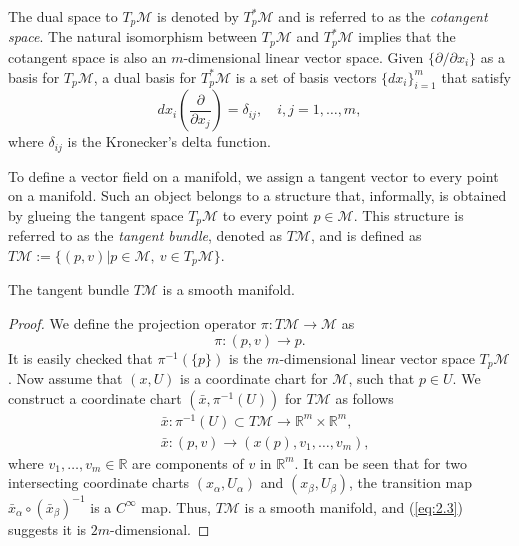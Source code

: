 The dual space to $T_p\mathcal M$ is denoted by $T_p^*\mathcal M$ and is referred to as the \emph{cotangent space}. The natural isomorphism between $T_p\mathcal M$ and $T_p^*\mathcal M$ implies that the cotangent space is also an $m$-dimensional linear vector space. Given $\{ \partial /\partial x_i \}$ as a basis for $T_p\mathcal M$, a dual basis for $T_p^*\mathcal M$ is a set of basis vectors $\{ dx_i \}_{i=1}^{m}$ that satisfy
\begin{equation} \label{eq:2.13}
	dx_i(\frac{\partial}{\partial x_j}) = \delta_{ij}, \quad i,j=1,\dots,m,
\end{equation}
where $\delta_{ij}$ is the Kronecker's delta function.

To define a vector field on a manifold, we assign a tangent vector to every point on a manifold. Such an object belongs to a structure that, informally, is obtained by glueing the tangent space $T_p\mathcal M$ to every point $p\in \mathcal M$. This structure is referred to as the \emph{tangent bundle}, denoted as $T \mathcal M$, and is defined as $T \mathcal M := \{ (p,v) | p\in \mathcal M, \ v \in T_p \mathcal M\}$.
\begin{theorem} \label{theorem:2.1}
\cite{robbin2011introduction} The tangent bundle $T\mathcal M$ is a smooth manifold.
\end{theorem}

\begin{proof}
We define the projection operator $\pi:T\mathcal M \to \mathcal M$ as
\begin{equation} \label{eq:2.2}
	\pi : (p,v) \to p.
\end{equation}
It is easily checked that $\pi^{-1}(\{p\})$ is the $m$-dimensional linear vector space $T_{p} \mathcal M$. Now assume that $(x,U)$ is a coordinate chart for $\mathcal M$, such that $p\in U$. We construct a coordinate chart $(\bar x , \pi^{-1}(U) )$ for $T\mathcal M$ as follows 
\begin{equation} \label{eq:2.3}
	\begin{aligned}
		&\bar x : \pi^{-1}(U) \subset T \mathcal M \to \mathbb R^m \times \mathbb R^m, \\
		&\bar x : (p,v) \to (x(p),v_1,\dots,v_m),
	\end{aligned}
\end{equation}
where $v_1,\dots,v_m\in \mathbb R$ are components of $v$ in $\mathbb R^m$. It can be seen that for two intersecting coordinate charts $(x_\alpha,U_\alpha)$ and $(x_\beta, U_\beta)$, the transition map $\bar x_{\alpha} \circ (\bar x_\beta)^{-1}$ is a $C^{\infty}$ map. Thus, $T \mathcal M$ is a smooth manifold, and (\ref{eq:2.3}) suggests it is $2m$-dimensional.
\end{proof}

